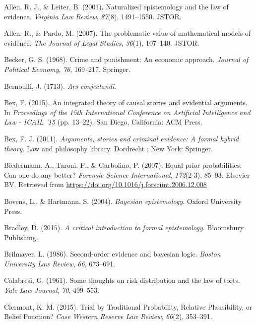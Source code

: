 \documentclass[11pt,dvipsnames,enabledeprecatedfontcommands]{scrartcl}
\begin{document}
\hypertarget{ref-allen2001naturalized}{}
Allen, R. J., \& Leiter, B. (2001). Naturalized epistemology and the law
of evidence. \emph{Virginia Law Review}, \emph{87}(8), 1491--1550.
JSTOR.

\hypertarget{ref-allen2007problematic}{}
Allen, R., \& Pardo, M. (2007). The problematic value of mathematical
models of evidence. \emph{The Journal of Legal Studies}, \emph{36}(1),
107--140. JSTOR.

\hypertarget{ref-becker1968crime}{}
Becker, G. S. (1968). Crime and punishment: An economic approach.
\emph{Journal of Political Economy}, \emph{76}, 169--217. Springer.

\hypertarget{ref-Bernoulli1713Ars-conjectandi}{}
Bernoulli, J. (1713). \emph{Ars conjectandi}.

\hypertarget{ref-bex2015IntegratedTheoryCausal}{}
Bex, F. (2015). An integrated theory of causal stories and evidential
arguments. In \emph{Proceedings of the 15th International Conference on
Artificial Intelligence and Law - ICAIL '15} (pp. 13--22). San Diego,
California: ACM Press.

\hypertarget{ref-bex2011ArgumentsStoriesCriminal}{}
Bex, F. J. (2011). \emph{Arguments, stories and criminal evidence: A
formal hybrid theory}. Law and philosophy library. Dordrecht ; New York:
Springer.

\hypertarget{ref-Biedermann2007equal}{}
Biedermann, A., Taroni, F., \& Garbolino, P. (2007). Equal prior
probabilities: Can one do any better? \emph{Forensic Science
International}, \emph{172}(2-3), 85--93. Elsevier BV. Retrieved from
\url{https://doi.org/10.1016/j.forsciint.2006.12.008}

\hypertarget{ref-bovens2004bayesian}{}
Bovens, L., \& Hartmann, S. (2004). \emph{Bayesian epistemology}. Oxford
University Press.

\hypertarget{ref-bradley2015critical}{}
Bradley, D. (2015). \emph{A critical introduction to formal
epistemology}. Bloomsbury Publishing.

\hypertarget{ref-brilmayer1986}{}
Brilmayer, L. (1986). Second-order evidence and bayesian logic.
\emph{Boston University Law Review}, \emph{66}, 673--691.

\hypertarget{ref-Calabresi1961}{}
Calabresi, G. (1961). Some thoughts on risk distribution and the law of
torts. \emph{Yale Law Journal}, \emph{70}, 499--553.

\hypertarget{ref-clermont2015TrialTraditionalProbability}{}
Clermont, K. M. (2015). Trial by Traditional Probability, Relative
Plausibility, or Belief Function? \emph{Case Western Reserve Law
Review}, \emph{66}(2), 353--391.
\end{document}
